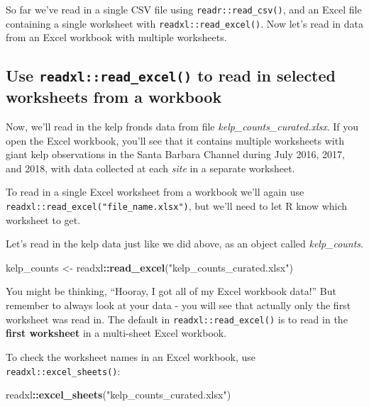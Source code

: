 \documentclass[]{book}
\newenvironment{Shaded}{\begin{snugshade}}{\end{snugshade}}
\newcommand{\KeywordTok}[1]{\textcolor[rgb]{0.13,0.29,0.53}{\textbf{#1}}}
\newcommand{\NormalTok}[1]{#1}
\newcommand{\OperatorTok}[1]{\textcolor[rgb]{0.81,0.36,0.00}{\textbf{#1}}}
\newcommand{\StringTok}[1]{\textcolor[rgb]{0.31,0.60,0.02}{#1}}
\begin{document}
So far we've read in a single CSV file using \texttt{readr::read\_csv()}, and an Excel file containing a single worksheet with \texttt{readxl::read\_excel()}. Now let's read in data from an Excel workbook with multiple worksheets.

\hypertarget{use-readxlread_excel-to-read-in-selected-worksheets-from-a-workbook}{%
\subsection{\texorpdfstring{Use \texttt{readxl::read\_excel()} to read in selected worksheets from a workbook}{Use readxl::read\_excel() to read in selected worksheets from a workbook}}\label{use-readxlread_excel-to-read-in-selected-worksheets-from-a-workbook}}

Now, we'll read in the kelp fronds data from file \emph{kelp\_counts\_curated.xlsx}. If you open the Excel workbook, you'll see that it contains multiple worksheets with giant kelp observations in the Santa Barbara Channel during July 2016, 2017, and 2018, with data collected at each \emph{site} in a separate worksheet.

To read in a single Excel worksheet from a workbook we'll again use \texttt{readxl::read\_excel("file\_name.xlsx")}, but we'll need to let R know which worksheet to get.

Let's read in the kelp data just like we did above, as an object called \emph{kelp\_counts}.

\begin{Shaded}
\begin{Highlighting}[]
\NormalTok{kelp_counts <-}\StringTok{ }\NormalTok{readxl}\OperatorTok{::}\KeywordTok{read_excel}\NormalTok{(}\StringTok{"kelp_counts_curated.xlsx"}\NormalTok{)}
\end{Highlighting}
\end{Shaded}

You might be thinking, ``Hooray, I got all of my Excel workbook data!'' But remember to always look at your data - you will see that actually only the first worksheet was read in. The default in \texttt{readxl::read\_excel()} is to read in the \textbf{first worksheet} in a multi-sheet Excel workbook.

To check the worksheet names in an Excel workbook, use \texttt{readxl::excel\_sheets()}:

\begin{Shaded}
\begin{Highlighting}[]
\NormalTok{readxl}\OperatorTok{::}\KeywordTok{excel_sheets}\NormalTok{(}\StringTok{"kelp_counts_curated.xlsx"}\NormalTok{)}
\end{Highlighting}
\end{Shaded}
\end{document}
